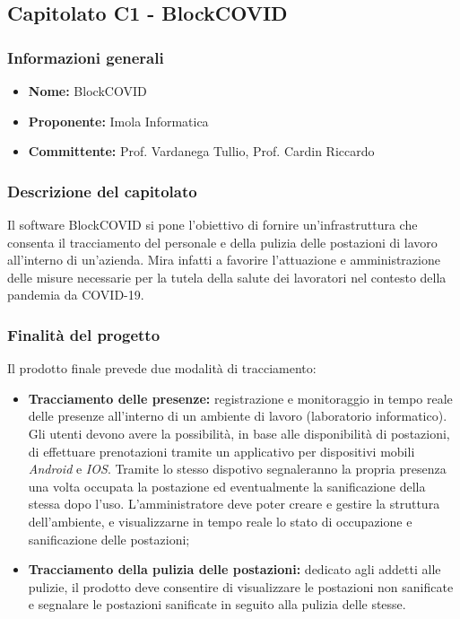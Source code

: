 \subsection{Capitolato C1 - BlockCOVID}


\subsubsection{Informazioni generali}

\begin{itemize}
	\item{\textbf{Nome:}} BlockCOVID
	\item{\textbf{Proponente:}} Imola Informatica
	\item{\textbf{Committente:}} Prof. Vardanega Tullio, Prof. Cardin Riccardo
\end{itemize}



\subsubsection{Descrizione del capitolato}

Il software BlockCOVID si pone l'obiettivo di fornire un'infrastruttura che consenta il tracciamento del personale e della pulizia delle postazioni di lavoro all'interno di un'azienda. Mira infatti a favorire l'attuazione e amministrazione delle misure necessarie per la tutela della salute dei lavoratori nel contesto della pandemia da COVID-19.



\subsubsection{Finalità del progetto}

Il prodotto finale prevede due modalità di tracciamento:
\begin{itemize}
	\item{\textbf{Tracciamento delle presenze:}} registrazione e monitoraggio in tempo reale delle presenze all'interno di un ambiente di lavoro (laboratorio informatico). Gli utenti devono avere la possibilità, in base alle disponibilità di postazioni, di effettuare prenotazioni tramite un applicativo per dispositivi mobili \textit{Android} e \textit{IOS}. Tramite lo stesso dispotivo segnaleranno la propria presenza una volta occupata la postazione ed eventualmente la sanificazione della stessa dopo l'uso. L'amministratore deve poter creare e gestire la struttura dell'ambiente, e visualizzarne in tempo reale lo stato di occupazione e sanificazione delle postazioni; 
	\item{\textbf{Tracciamento della pulizia delle postazioni:}} dedicato agli addetti alle pulizie, il prodotto deve consentire di visualizzare le postazioni non sanificate e segnalare le postazioni sanificate in seguito alla pulizia delle stesse.
\end{itemize}



